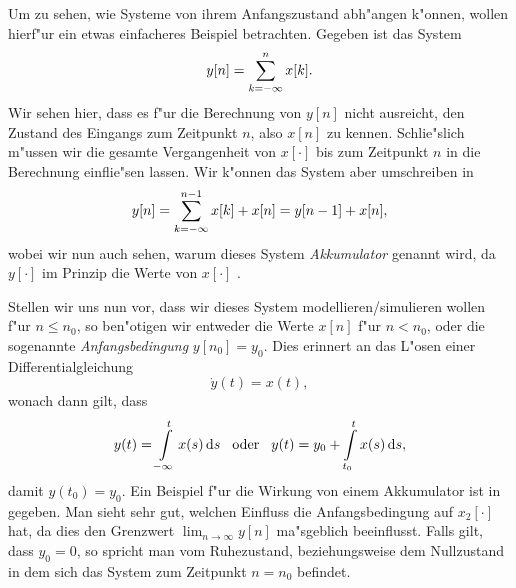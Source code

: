 Um zu sehen, wie Systeme von ihrem Anfangszustand abh"angen k"onnen, wollen hierf"ur ein etwas einfacheres Beispiel betrachten. 
Gegeben ist das System
\[
y[n] = {\sum\limits_{k=-\infty}^{n}{x[k]}}.
\]
Wir sehen hier, dass es f"ur die Berechnung von $y[n]$ nicht ausreicht, den Zustand des Eingangs zum Zeitpunkt $n$, also $x[n]$ zu kennen.
Schlie"slich m"ussen wir die gesamte Vergangenheit von $x[\cdot]$ bis zum Zeitpunkt $n$ in die Berechnung einflie"sen lassen.
Wir k"onnen das System aber umschreiben in 
\[
y[n] = {\sum\limits_{k=-\infty}^{n-1}{x[k]}} + x[n] = y[n-1] + x[n],
\]
wobei wir nun auch sehen, warum dieses System \emph{Akkumulator} genannt wird, da $y[\cdot]$ im Prinzip die Werte von $x[\cdot]$ .

Stellen wir uns nun vor, dass wir dieses System modellieren/simulieren wollen f"ur $n \leqslant n_0$, so ben"otigen wir entweder die Werte $x[n]$ f"ur $n < n_0$, oder die sogenannte \emph{Anfangsbedingung} $y[n_0] = y_0$.
Dies erinnert an das L"osen einer Differentialgleichung
\[
\dot{y}(t) = x(t),
\]
wonach dann gilt, dass
\[
y(t) = {\int\limits_{-\infty}^{t}{x(s)}\,\mathrm{d}{s}} 
{\hspace{3mm} \text{oder} \hspace{3mm}}
y(t) = y_0 + {\int\limits_{t_0}^{t}{x(s)}\,\mathrm{d}{s}},
\]
damit $y(t_0) = y_0$.
Ein Beispiel f"ur die Wirkung von einem Akkumulator ist in  gegeben. 
Man sieht sehr gut, welchen Einfluss die Anfangsbedingung auf $x_2[\cdot]$ hat, da dies den Grenzwert $\lim_{n \rightarrow \infty} y[n]$ ma"sgeblich beeinflusst.
Falls gilt, dass $y_0 = 0$, so spricht man vom Ruhezustand, beziehungsweise dem Nullzustand in dem sich das System zum Zeitpunkt $n = n_0$ befindet.
%
